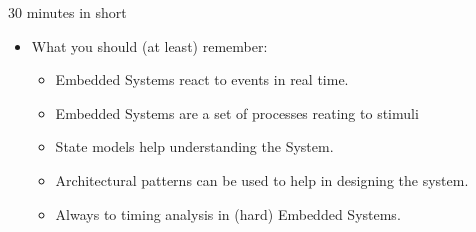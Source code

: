 \documentclass[ngerman={babel}, utf8, bigger, t, xcolor={table,dvipsnames}, ompress, hyperref={bookmarks,colorlinks}]{beamer}
\begin{document}
\begin{frame}{30 minutes in short}
	\begin{itemize}
		\item What you should (at least) remember:
		\begin{itemize}
			\item Embedded Systems react to events in real time.
			\item Embedded Systems are a set of processes reating to stimuli
			\item State models help understanding the System.
			\item Architectural patterns can be used to help in designing the system.
			\item Always to timing analysis in (hard) Embedded Systems.
		\end{itemize}
	\end{itemize}
\end{frame}
\end{document}
